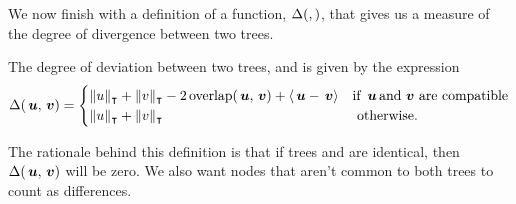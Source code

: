 \begin{definition}



\end{definition}


We now finish with a definition of a function, $\Delta(,)$, that gives us a
measure of the degree of divergence between two trees.
\begin{definition}
  \label{defdeviation}
  The degree of deviation between two trees,  and  is given  by the expression
  \begin{equation}
    \Delta(\,\boldsymbol{u},\,\boldsymbol{v}) = \begin{cases}
      \lVert{u}\rVert_{\intercal} + \lVert{v}\rVert_{\intercal} - 2\operatorname{overlap}(\,\boldsymbol{u},\,\boldsymbol{v}) + \langle{\,\boldsymbol{u} - \,\boldsymbol{v}}\rangle&\text{if }\,\boldsymbol{u} \operatorname{\text{and}} \,\boldsymbol{v} \text{ are compatible} \\
      \lVert{u}\rVert_{\intercal} + \lVert{v}\rVert_{\intercal} & \text{ otherwise.}
    \end{cases}
  \end{equation}
  
  The rationale behind this definition is that if trees  and  are identical, then
  $\Delta(\,\boldsymbol{u},\,\boldsymbol{v})$ will be zero. We also want nodes that aren't common to both trees to
  count as differences.
\end{definition}
